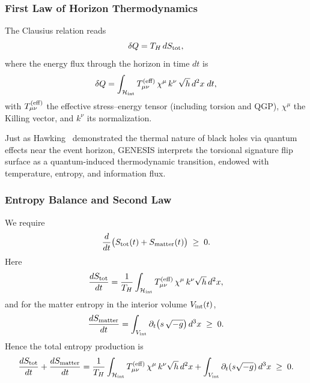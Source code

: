 \documentclass{article}
\begin{document}
\subsubsection{First Law of Horizon Thermodynamics}
The Clausius relation reads
\begin{equation}\label{eq:auto52}
\delta Q = T_H\,dS_{\rm tot},
\end{equation}
where the energy flux through the horizon in time $dt$ is
\begin{equation}\label{eq:auto53}
\delta Q
  = \int_{\mathcal H_{\rm int}}
    T_{\mu\nu}^{\rm (eff)}\,\chi^\mu\,k^\nu\,
    \sqrt{h}\,d^2x\;dt,
\end{equation}
with $T_{\mu\nu}^{\rm (eff)}$ the effective stress–energy tensor (including
torsion and QGP), $\chi^\mu$ the Killing vector, and $k^\nu$ its normalization.


Just as Hawking~\cite{hawking1975} demonstrated the thermal nature of black holes via quantum effects near the event horizon, GENESIS interprets the torsional signature flip surface as a quantum-induced thermodynamic transition, endowed with temperature, entropy, and information flux.



\subsubsection{Entropy Balance and Second Law}
We require
\begin{equation}\label{eq:auto54}
\frac{d}{dt}\bigl(S_{\rm tot}(t) + S_{\rm matter}(t)\bigr)
  \;\ge\;0.
\end{equation}
Here
\begin{equation}\label{eq:auto55}
\frac{dS_{\rm tot}}{dt}
  = \frac{1}{T_H}
    \int_{\mathcal H_{\rm int}}
      T_{\mu\nu}^{\rm (eff)}\,\chi^\mu\,k^\nu
      \sqrt{h}\,d^2x,
\end{equation}
and for the matter entropy in the interior volume $V_{\rm int}(t)$,
\begin{equation}\label{eq:auto56}
\frac{dS_{\rm matter}}{dt}
  = \int_{V_{\rm int}}
    \partial_t\bigl(s\,\sqrt{-g}\bigr)\,d^3x
  \;\ge\;0.
\end{equation}
Hence the total entropy production is
\begin{equation}\label{eq:auto57}
\frac{dS_{\rm tot}}{dt} + \frac{dS_{\rm matter}}{dt}
  = \frac{1}{T_H}
    \int_{\mathcal H_{\rm int}}
      T_{\mu\nu}^{\rm (eff)}\,\chi^\mu\,k^\nu\sqrt{h}\,d^2x
    + \int_{V_{\rm int}}\partial_t(s\sqrt{-g})\,d^3x
  \;\ge\;0.
\end{equation}
\end{document}
